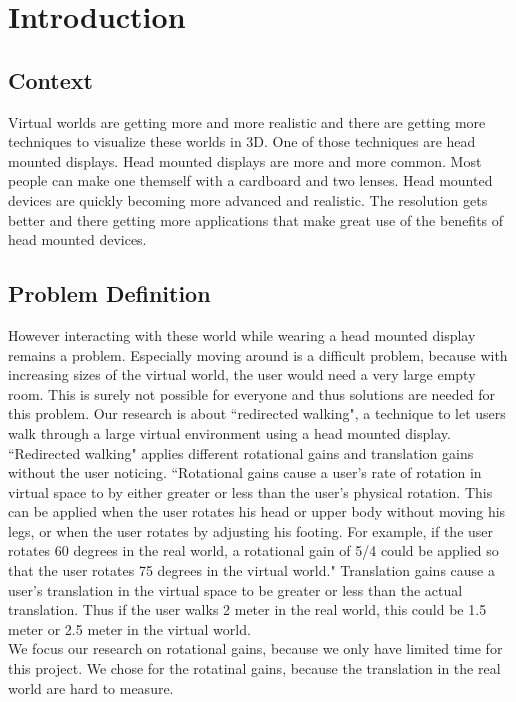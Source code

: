 \section{Introduction}
\subsection{Context}\label{sec:context}
Virtual worlds are getting more and more realistic and there are getting more techniques to visualize these worlds in 3D. One of those techniques are head mounted displays. Head mounted displays are more and more common. Most people can make one themself with a cardboard and two lenses. Head mounted devices are quickly becoming more advanced and realistic. The resolution gets better and there getting more applications that make great use of the benefits of head mounted devices. 
\subsection{Problem Definition}\label{sec:problem}
However interacting with these world while wearing a head mounted display remains a problem. Especially moving around is a difficult problem, because with increasing sizes of the virtual world, the user would need a very large empty room. This is surely not possible for everyone and thus solutions are needed for this problem. 
Our research is about ``redirected walking", a technique to let users walk through a large virtual environment using a head mounted display. ``Redirected walking"  applies different rotational gains and translation gains without the user noticing. 
``Rotational gains cause a user's rate of rotation in virtual space to by either greater or less than 
the user's physical rotation. This can be applied when the user rotates his head or upper body 
without moving his legs, or when the user rotates by adjusting his footing. For example, if the 
user rotates 60 degrees in the real world, a rotational gain of 5/4 could be applied so that the 
user rotates 75 degrees in the virtual world."\cite{jwalker}
Translation gains cause a user's translation in the virtual space to be greater or less than the actual translation. Thus if the user walks 2 meter in the real world, this could be 1.5 meter or 2.5 meter in the virtual world. \\
We focus our research on rotational gains, because we only have limited time for this project. We chose for the rotatinal gains, because the translation in the real world are hard to measure.


